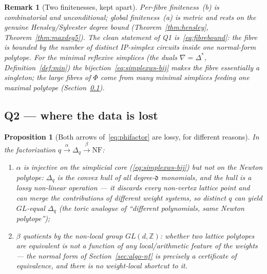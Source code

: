 \documentclass{amsart}
\newtheorem{proposition}[theorem]{Proposition}
\newtheorem{remark}[theorem]{Remark}
\begin{document}
\begin{remark}[Two finitenesses, kept apart]\label{rmk:twofinite}
Per-fibre finiteness~(b) is combinatorial and unconditional; global
finiteness~(a) is metric and rests on the genuine Hensley/Sylvester degree
bound (Theorem~\ref{thm:hensley}, Theorem~\ref{thm:maxdeg5}). The clean
statement of Q1 is~\eqref{eq:fibrebound}: \emph{the fibre is bounded by the
number of distinct IP-simplex circuits inside one normal-form polytope.}
For the \emph{minimal} reflexive simplices (the duals $\nabla=\Delta^*$,
Definition~\ref{def:min}) the bijection~\eqref{eq:simplexws-bij} makes the
fibre essentially a singleton; the large fibres of $\Phi$ come from
\emph{many minimal simplices feeding one maximal polytope}
(Section~\ref{sec:fibre-loss}).
\end{remark}

\subsection{Q2 --- where the data is lost}\label{sec:fibre-loss}

\begin{proposition}[Both arrows of~\eqref{eq:phifactor} are lossy, for
different reasons]\label{prop:lossy}
In the factorization $q\xrightarrow{\alpha}\Delta_q\xrightarrow{\beta}
\mathrm{NF}$:
\begin{enumerate}
  \item $\alpha$ is injective on the simplicial core
        (\eqref{eq:simplexws-bij}) but \emph{not} on the Newton polytope:
        $\Delta_q$ is the \emph{convex hull} of all degree-$\mathfrak d$
        monomials, and the hull is a lossy non-linear operation --- it discards
        every non-vertex lattice point and can \emph{merge} the contributions
        of different weight systems, so distinct $q$ can yield
        $GL$-equal $\Delta_q$ (the toric analogue of ``different polynomials,
        same Newton polytope'');
  \item $\beta$ quotients by the \emph{non-local} group $GL(d,\mathbb Z)$:
        whether two lattice polytopes are equivalent is not a function of any
        local/arithmetic feature of the weights --- the normal form of
        Section~\ref{sec:algo-nf} is precisely a \emph{certificate} of
        equivalence, and there is no weight-local shortcut to it.
\end{enumerate}
\end{proposition}
\end{document}
